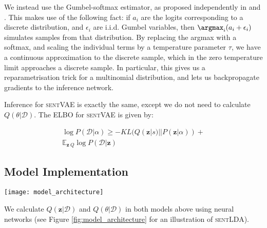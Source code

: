 We instead use the Gumbel-softmax estimator, as proposed independently in \citet{Maddison:17} and \citet{Jang:17}. This makes use of the following fact: if $a_i$ are the logits corresponding to a discrete distribution, and $\epsilon_i$ are i.i.d. Gumbel variables, then $\argmax_i (a_i + \epsilon_i)$ simulates samples from that distribution. By replacing the argmax with a softmax, and scaling the individual terms by a temperature parameter $\tau$, we have a continuous approximation to the discrete sample, which in the zero temperature limit approaches a discrete sample. In particular, this gives us a reparametrisation trick for a multinomial distribution, and lets us backpropagate gradients to the inference network.

Inference for \textsc{sentVAE} is exactly the same, except we do not need to calculate $Q(\theta|\mathcal{D})$. The ELBO for \textsc{sentVAE} is given by:

\begin{multline}
\log P(\mathcal{D} | \alpha) \geq -KL(Q(\mathbf{z}|s) || P(\mathbf{z}|\alpha)) + \\ \mathbb{E}_{\mathbf{z} ~ Q} \log P(\mathcal{D} | \mathbf{z})
\end{multline}

\subsection{Model Implementation}

\begin{figure*}
    \centering
    \texttt{[image: model\_architecture]}
    \caption{The model architecture of \textsc{sentLDA}. The document consists of two sentences: \textit{I do not like} and \textit{green eggs and ham}. Arrows represent the flow of information, and dashed arrows indicate sampling. Stochastic variables are represented as circles, and deterministic variables are represented in rounded rectangles. The red dashed line indicates that the KL between the two variables is minimised during training. The architecture of \textsc{sentVAE} is very similar, except there is no document level RNN and no document-level $\theta$.}
    \label{fig:model_architecture}
\end{figure*}

We calculate $Q(\mathbf{z}|\mathcal{D})$ and $Q(\theta | \mathcal{D})$ in both models above using neural networks (see Figure \ref{fig:model_architecture} for an illustration of \textsc{sentLDA}).

